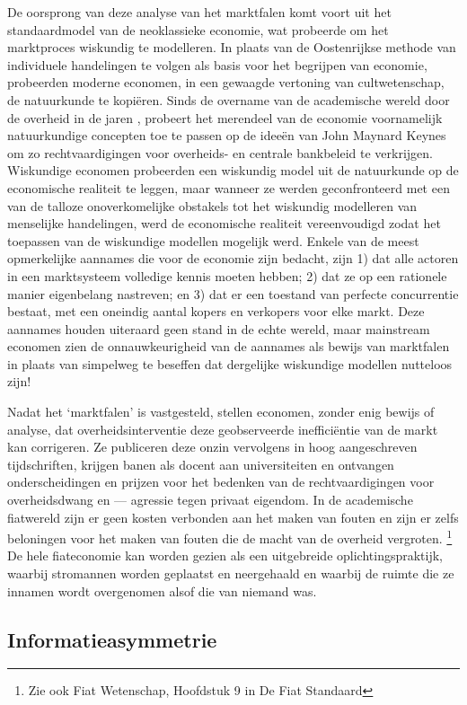 \documentclass[
  a5paper,
  smalldemyvopaper,11pt,twoside,onecolumn,openright,extrafontsizes,
hidelinks]{memoir}
\begin{document}
De oorsprong van deze analyse van het marktfalen komt voort uit het
standaardmodel van de neoklassieke economie, wat probeerde om het
marktproces wiskundig te modelleren. In plaats van de Oostenrijkse
methode van individuele handelingen te volgen als basis voor het
begrijpen van economie, probeerden moderne economen, in een gewaagde
vertoning van cultwetenschap, de natuurkunde te kopiëren. Sinds de
overname van de academische wereld door de overheid in de jaren ,
probeert het merendeel van de economie voornamelijk natuurkundige
concepten toe te passen op de ideeën van John Maynard Keynes om zo
rechtvaardigingen voor overheids- en centrale bankbeleid te verkrijgen.
Wiskundige economen probeerden een wiskundig model uit de natuurkunde op
de economische realiteit te leggen, maar wanneer ze werden
geconfronteerd met een van de talloze onoverkomelijke obstakels tot het
wiskundig modelleren van menselijke handelingen, werd de economische
realiteit vereenvoudigd zodat het toepassen van de wiskundige modellen
mogelijk werd. Enkele van de meest opmerkelijke aannames die voor de
economie zijn bedacht, zijn 1) dat alle actoren in een marktsysteem
volledige kennis moeten hebben; 2) dat ze op een rationele manier
eigenbelang nastreven; en 3) dat er een toestand van perfecte
concurrentie bestaat, met een oneindig aantal kopers en verkopers voor
elke markt. Deze aannames houden uiteraard geen stand in de echte
wereld, maar mainstream economen zien de onnauwkeurigheid van de
aannames als bewijs van marktfalen in plaats van simpelweg te beseffen
dat dergelijke wiskundige modellen nutteloos zijn!

Nadat het `marktfalen' is vastgesteld, stellen economen, zonder enig
bewijs of analyse, dat overheidsinterventie deze geobserveerde
inefficiëntie van de markt kan corrigeren. Ze publiceren deze onzin
vervolgens in hoog aangeschreven tijdschriften, krijgen banen als docent
aan universiteiten en ontvangen onderscheidingen en prijzen voor het
bedenken van de rechtvaardigingen voor overheidsdwang en --- agressie
tegen privaat eigendom. In de academische fiatwereld zijn er geen kosten
verbonden aan het maken van fouten en zijn er zelfs beloningen voor het
maken van fouten die de macht van de overheid vergroten. \footnote{Zie
  ook Fiat Wetenschap, Hoofdstuk 9 in De Fiat Standaard} De hele
fiateconomie kan worden gezien als een uitgebreide oplichtingspraktijk,
waarbij stromannen worden geplaatst en neergehaald en waarbij de ruimte
die ze innamen wordt overgenomen alsof die van niemand was.

\subsection{Informatieasymmetrie}\label{informatieasymmetrie}
\end{document}
